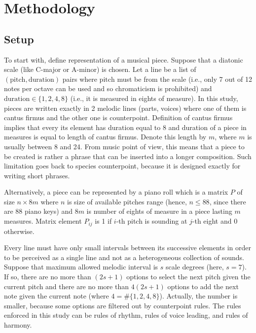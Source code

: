\documentclass{article}
\begin{document}
\section{Methodology}
\label{sec:methodology}

\subsection{Setup}
\label{subsec:setup}

To start with, define representation of a musical piece. Suppose that a diatonic scale (like C-major or A-minor) is chosen. Let a line be a list of $(\mathrm{pitch}, \mathrm{duration})$ pairs where $\mathrm{pitch}$ must be from the scale (i.e., only 7 out of 12 notes per octave can be used and so chromaticism is prohibited) and $\mathrm{duration} \in \{1, 2, 4, 8\}$ (i.e., it is measured in eights of measure). In this study, pieces are written exactly in 2 melodic lines (parts, voices) where one of them is cantus firmus and the other one is counterpoint. Definition of cantus firmus implies that every its element has duration equal to 8 and duration of a piece in measures is equal to length of cantus firmus. Denote this length by $m$, where $m$ is usually between 8 and 24. From music point of view, this means that a piece to be created is rather a phrase that can be inserted into a longer composition. Such limitation goes back to species counterpoint, because it is designed exactly for writing short phrases.

Alternatively, a piece can be represented by a piano roll which is a matrix $P$ of size $n \times 8m$ where $n$ is size of available pitches range (hence, $n \le 88$, since there are 88 piano keys) and $8m$ is number of eights of measure in a piece lasting $m$ measures. Matrix element $P_{ij}$ is 1 if $i$-th pitch is sounding at $j$-th eight and 0 otherwise.

Every line must have only small intervals between its successive elements in order to be perceived as a single line and not as a heterogeneous collection of sounds. Suppose that maximum allowed melodic interval is $s$ scale degrees (here, $s = 7$). If so, there are no more than $(2s + 1)$ options to select the next pitch given the current pitch and there are no more than $4(2s + 1)$ options to add the next note given the current note (where $4 = \#\{1, 2, 4, 8\}$). Actually, the number is smaller, because some options are filtered out by counterpoint rules. The rules enforced in this study can be rules of rhythm, rules of voice leading, and rules of harmony.
\end{document}
